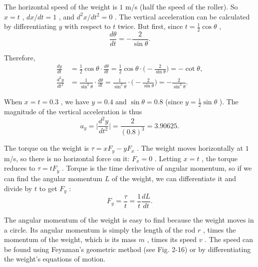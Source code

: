 \documentclass[11pt,oneside]{article}
\providecommand{\ddt}[2]{\frac{d#1}{d#2}}
\begin{document}
The horizontal speed of the weight is \(1\) m/s (half the speed of the roller). So \(x = t\) , \(dx/dt = 1\) , and \(d^2x/dt^2 = 0\) . The vertical acceleration can be calculated by differentiating \(y\) with respect to \(t\) twice. But first, since \(t = \frac12\cos\theta\) , 
\begin{equation*} \ddt{\theta}{t} = -\frac{2}{\sin\theta}. \end{equation*}
\par

Therefore, 
\begin{equation*} \begin{aligned} \ddt{y}{t} &= {\textstyle\frac12}\cos\theta \cdot \ddt{\theta}{t} = {\textstyle\frac12}\cos\theta \cdot\biggl(-\frac{2}{\sin\theta}\biggr) = -\cot\theta,\\[2ex] \frac{d^2y}{dt^2} &= \frac{1}{\sin^2\theta}\cdot \ddt{\theta}{t} = \frac{1}{\sin^2\theta}\cdot\biggl(-\frac{2}{\sin\theta}\biggr) = -\frac{2}{\sin^3\theta}. \end{aligned} \end{equation*}
\par

When \(x=t=0.3\) , we have \(y=0.4\) and \(\sin\theta=0.8\) (since \(y=\frac12\sin\theta\) ). The magnitude of the vertical acceleration is thus 
\begin{equation*} a_y = \biggl|\frac{d^2y}{dt^2}\biggr| = \frac{2}{(0.8)^3} = 3.90625. \end{equation*}
\par

The torque on the weight is \(\tau=xF_y-yF_x\) . The weight moves horizontally at \(1\) m/s, so there is no horizontal force on it: \(F_x=0\) . Letting \(x=t\) , the torque reduces to \(\tau=tF_y\) . Torque is the time derivative of angular momentum, so if we can find the angular momentum \(L\) of the weight, we can differentiate it and divide by \(t\) to get \(F_y\) : 
\begin{equation*} F_y = \frac{\tau}{t}=\frac{1}{t}\ddt{L}{t}. \end{equation*}
\par

The angular momentum of the weight is easy to find because the weight moves in a circle. Its angular momentum is simply the length of the rod \(r\) , times the momentum of the weight, which is its mass \(m\) , times its speed \(v\) . The speed can be found using Feynman's geometric method (see Fig. 2-16) or by differentiating the weight's equations of motion.\par
\end{document}
